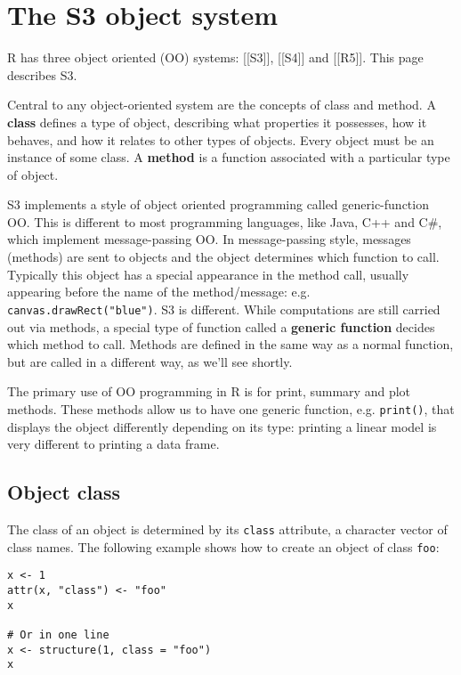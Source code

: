 \hypertarget{the-s3-object-system}{%
\chapter{The S3 object system}\label{the-s3-object-system}}

R has three object oriented (OO) systems: {[}{[}S3{]}{]}, {[}{[}S4{]}{]}
and {[}{[}R5{]}{]}. This page describes S3.

Central to any object-oriented system are the concepts of class and
method. A \textbf{class} defines a type of object, describing what
properties it possesses, how it behaves, and how it relates to other
types of objects. Every object must be an instance of some class. A
\textbf{method} is a function associated with a particular type of
object.

S3 implements a style of object oriented programming called
generic-function OO. This is different to most programming languages,
like Java, C++ and C\#, which implement message-passing OO. In
message-passing style, messages (methods) are sent to objects and the
object determines which function to call. Typically this object has a
special appearance in the method call, usually appearing before the name
of the method/message: e.g. \texttt{canvas.drawRect("blue")}. S3 is
different. While computations are still carried out via methods, a
special type of function called a \textbf{generic function} decides
which method to call. Methods are defined in the same way as a normal
function, but are called in a different way, as we'll see shortly.

The primary use of OO programming in R is for print, summary and plot
methods. These methods allow us to have one generic function, e.g.
\texttt{print()}, that displays the object differently depending on its
type: printing a linear model is very different to printing a data
frame.

\hypertarget{object-class}{%
\section{Object class}\label{object-class}}

The class of an object is determined by its \texttt{class} attribute, a
character vector of class names. The following example shows how to
create an object of class \texttt{foo}:

\begin{verbatim}
x <- 1
attr(x, "class") <- "foo"
x

# Or in one line
x <- structure(1, class = "foo")
x
\end{verbatim}

